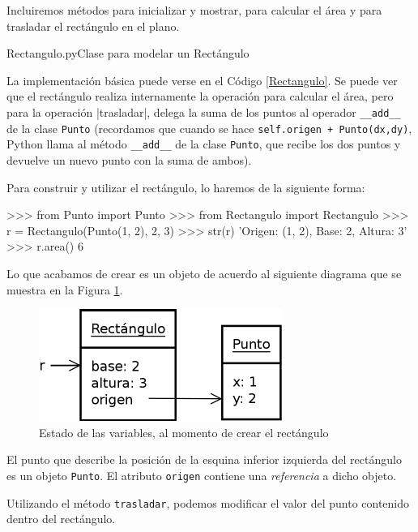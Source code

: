 Incluiremos métodos para inicializar y mostrar, para calcular el área y
para trasladar el rectángulo en el plano.

\begin{codigo}{Rectangulo.py}{Clase para modelar un Rectángulo}
\label{Rectangulo}

\end{codigo}

La implementación básica puede verse en el Código \ref{Rectangulo}.  Se
puede ver que el rectángulo realiza internamente la operación para calcular
el área, pero para la operación |trasladar|, delega la suma de los puntos
al operador \lstinline!__add__! de la clase \lstinline!Punto!
(recordamos que cuando se hace \lstinline!self.origen + Punto(dx,dy)!,
Python llama al método \lstinline!__add__! de la clase \lstinline!Punto!,
que recibe los dos puntos y devuelve un nuevo punto con la suma de ambos).

Para construir y utilizar el rectángulo, lo haremos de la siguiente forma:

\begin{codigo-python-sn}
>>> from Punto import Punto
>>> from Rectangulo import Rectangulo
>>> r = Rectangulo(Punto(1, 2), 2, 3)
>>> str(r)
'Origen: (1, 2), Base: 2, Altura: 3'
>>> r.area()
6
\end{codigo-python-sn}

Lo que acabamos de crear es un objeto de acuerdo al siguiente diagrama que
se muestra en la Figura \ref{rectangulo_punto}.

\begin{figure}[htb]
\includegraphics{graficos/15_Rectangulo_Punto}
\caption{Estado de las variables, al momento de crear el rectángulo}
\label{rectangulo_punto}
\end{figure}

El punto que describe la posición de la esquina inferior izquierda del
rectángulo es un objeto \lstinline!Punto!. El atributo \lstinline!origen!
contiene una \emph{referencia} a dicho objeto.

Utilizando el método \lstinline!trasladar!, podemos modificar el valor del
punto contenido dentro del rectángulo.

